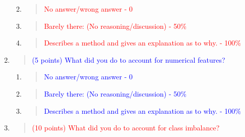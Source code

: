 \documentclass[
]{article}
\begin{document}
\begin{enumerate}
  \begin{enumerate}
  \def\labelenumii{\alph{enumii}.}
  \item
    \begin{quote}
    \textcolor{red}{No answer/wrong answer - 0}
    \end{quote}
  \item
    \begin{quote}
    \textcolor{red}{Barely there: (No reasoning/discussion) - 50\%}
    \end{quote}
  \item
    \begin{quote}
    \textcolor{red}{Describes a method and gives an explanation as to why. - 100\%}
    \end{quote}
  \end{enumerate}
\item
  \begin{quote}
  \textcolor{blue}{(5 points) What did you do to account for numerical features?}
  \end{quote}

  \begin{enumerate}
  \def\labelenumii{\alph{enumii}.}
  \item
    \begin{quote}
    \textcolor{blue}{No answer/wrong answer - 0}
    \end{quote}
  \item
    \begin{quote}
    \textcolor{blue}{Barely there: (No reasoning/discussion) - 50\%}
    \end{quote}
  \item
    \begin{quote}
    \textcolor{blue}{Describes a method and gives an explanation as to why. - 100\%}
    \end{quote}
  \end{enumerate}
\item
  \begin{quote}
  \textcolor{red}{(10 points) What did you do to account for class imbalance?}
  \end{quote}


\end{enumerate}
\end{document}
